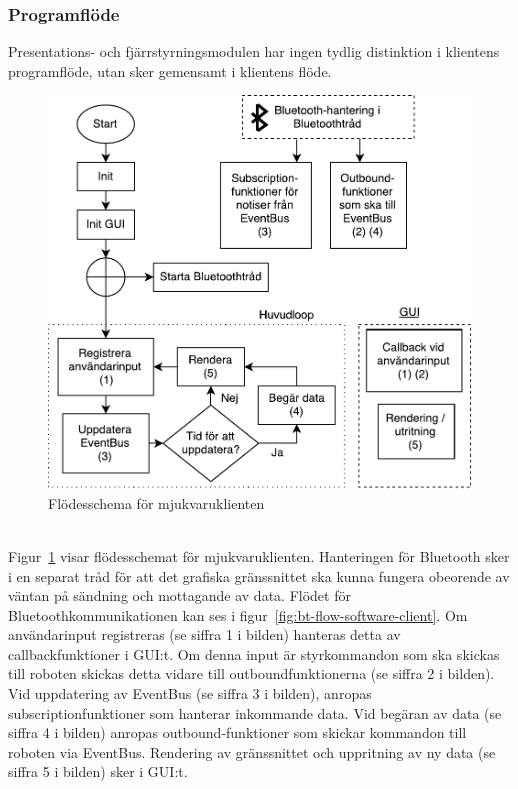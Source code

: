\documentclass{article}
\begin{document}
\subsubsection{Programflöde}
Presentations- och fjärrstyrningsmodulen har ingen tydlig distinktion i klientens programflöde, utan sker gemensamt i klientens flöde.

\begin{figure}[H]
\centering
\includegraphics[scale=0.55]{software_client_flowchart}
\caption{Flödesschema för mjukvaruklienten}
\label{fig:software_client_flowchart}
\end{figure}
\ \\
Figur~\ref{fig:software_client_flowchart} visar flödesschemat för mjukvaruklienten. Hanteringen för Bluetooth sker i en separat tråd för att det grafiska gränssnittet ska kunna fungera obeorende av väntan på sändning och mottagande av data. Flödet för Bluetoothkommunikationen kan ses i figur~\ref{fig:bt-flow-software-client}. Om användarinput registreras (se siffra 1 i bilden) hanteras detta av callbackfunktioner i GUI:t. Om denna input är styrkommandon som ska skickas till roboten skickas detta vidare till outboundfunktionerna (se siffra 2 i bilden). Vid uppdatering av EventBus (se siffra 3 i bilden), anropas subscriptionfunktioner som hanterar inkommande data. Vid begäran av data (se siffra 4 i bilden) anropas outbound-funktioner som skickar kommandon till roboten via EventBus. Rendering av gränssnittet och uppritning av ny data (se siffra 5 i bilden) sker i GUI:t.
\end{document}
